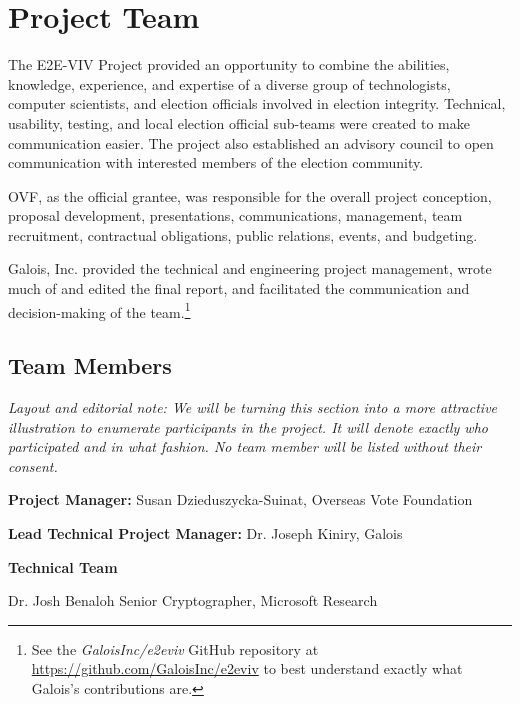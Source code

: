 \section{Project Team}
\label{sec:people}

The E2E-VIV Project provided an opportunity to combine the abilities,
knowledge, experience, and expertise of a diverse group of
technologists, computer scientists, and election officials involved in
election integrity. Technical, usability, testing, and local election
official sub-teams were created to make communication easier. The
project also established an advisory council to open communication
with interested members of the election community.

OVF, as the official grantee, was responsible for the overall project
conception, proposal development, presentations, communications,
management, team recruitment, contractual obligations, public
relations, events, and budgeting. 

Galois, Inc. provided the technical and engineering project
management, wrote much of and edited the final report, and facilitated
the communication and decision-making of the team.\footnote{See the
  \emph{GaloisInc/e2eviv} GitHub repository at
  \url{https://github.com/GaloisInc/e2eviv} to best understand exactly
  what Galois's contributions are.}

\subsection{Team Members}
\label{sec:team-members}

\begin{center}
\emph{Layout and editorial note: We will be turning this section into
  a more attractive illustration to enumerate participants in the
  project. It will denote exactly who participated and in what
  fashion.  No team member will be listed without their consent.}
\end{center}
  
\textbf{Project Manager:} Susan Dzieduszycka-Suinat, Overseas Vote Foundation

\textbf{Lead Technical Project Manager:} Dr. Joseph Kiniry, Galois

\textbf{Technical Team}

Dr. Josh Benaloh
Senior Cryptographer, Microsoft Research
 
